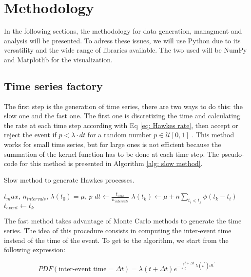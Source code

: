 \chapter{Methodology}\label{ch:metodologia}

In the following sections, the methodology for data generation, managment and analysis will be presented. To adress these issues, we will use Python \cite{McKinney,VanderPlas} due to 
its versatility and the wide range of libraries available. The two used will be NumPy \cite{numpy} and Matplotlib \cite{matplotlib} for the visualization.
 
\section{Time series factory}\label{sec:time_series_factory}

The first step is the generation of time series, there are two ways to do this: the slow one and the fast one. The first one is discretizing the time and calculating the rate at each time step
according with Eq \ref{eq: Hawkes rate}, then accept or reject the event if $p<\lambda \cdot dt$ for a random number $p\in \mathcal{U}[0,1]$ . 
This method works for small time series, but for large ones is not efficient because the summation of the kernel function has to be done at each time step. The pseudo-code for this method is
presented in Algorithm \ref{alg: slow method}.

\begin{algorithm}
    \caption{Slow method to generate Hawkes processes.}\label{alg: slow method}
    \begin{algorithmic}
        \Require $t_max$, $n_{intervals}$, $\lambda(t_0)=\mu$, $p$
        \State $dt \gets \frac{t_{max}}{n_{intervals}}$
            \State $\lambda(t_k) \gets \mu + n\sum_{t_i<t_k}\phi(t_k-t_i)$ 
                \State $t_{event} \gets t_k$
            \EndIf
        \EndFor
        \end{algorithmic}
\end{algorithm}

The fast method takes advantage of Monte Carlo methods \cite{barbu2020monte} to generate the time series. The idea of this procedure consists in computing the inter-event time instead 
of the time of the event. To get to the algorithm, we start from the following expression:

\begin{equation}
    PDF(\text{inter-event time}=\Delta t) = \lambda(t+\Delta t) e^{-\int_t^{t+\Delta t}\lambda(t^\prime)dt^\prime} 
    \label{eq: inter-event time PDF}
\end{equation}

